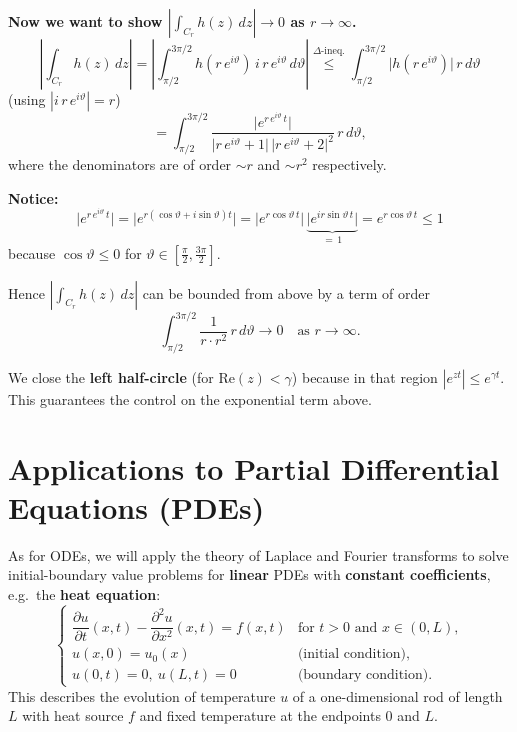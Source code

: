 \begin{example}
\medskip

\textbf{Now we want to show $\left|\int_{C_r} h(z)\,dz\right| \to 0$ as $r \to \infty$.}
\[
\left|\int_{C_r} h(z)\,dz\right|
= \left|\int_{\pi/2}^{3\pi/2} h(r\,e^{i\vartheta})\,i\,r\,e^{i\vartheta}\,d\vartheta\right|
\overset{\Delta\text{-ineq.}}{\leq}
\int_{\pi/2}^{3\pi/2} \bigl|h(r\,e^{i\vartheta})\bigr|\,r\,d\vartheta
\]
(using $|i\,r\,e^{i\vartheta}| = r$)
\[
= \int_{\pi/2}^{3\pi/2} \frac{\bigl|e^{r\,e^{i\vartheta}\,t}\bigr|}{\bigl|r\,e^{i\vartheta} + 1\bigr|\,\bigl|r\,e^{i\vartheta} + 2\bigr|^2}\,r\,d\vartheta,
\]
where the denominators are of order $\sim r$ and $\sim r^2$ respectively.

\textbf{Notice:}
\[
\bigl|e^{r\,e^{i\vartheta}\,t}\bigr|
= \bigl|e^{r(\cos\vartheta + i\sin\vartheta)t}\bigr|
= \bigl|e^{r\cos\vartheta\,t}\bigr|\,\underbrace{\bigl|e^{ir\sin\vartheta\,t}\bigr|}_{=\,1}
= e^{r\cos\vartheta\,t} \leq 1
\]
because $\cos\vartheta \leq 0$ for $\vartheta \in [\tfrac{\pi}{2}, \tfrac{3\pi}{2}]$.

Hence $\left|\int_{C_r} h(z)\,dz\right|$ can be bounded from above by a term of order
\[
\int_{\pi/2}^{3\pi/2} \frac{1}{r\cdot r^2}\,r\,d\vartheta \to 0 \quad \text{as } r \to \infty.
\]

\begin{remark}
We close the \textbf{left half-circle} (for $\mathrm{Re}(z) < \gamma$) because in that region $|e^{zt}| \leq e^{\gamma t}$. This guarantees the control on the exponential term above.
\end{remark}
\end{example}

\section{Applications to Partial Differential Equations (PDEs)}

As for ODEs, we will apply the theory of Laplace and Fourier transforms to solve initial-boundary value problems for \textbf{linear} PDEs with \textbf{constant coefficients}, e.g.\ the \textbf{heat equation}:
\[
\begin{cases}
\dfrac{\partial u}{\partial t}(x, t) - \dfrac{\partial^2 u}{\partial x^2}(x, t) = f(x, t)
& \text{for } t > 0 \text{ and } x \in (0, L), \\[2pt]
u(x, 0) = u_0(x) & \text{(initial condition),} \\[2pt]
u(0, t) = 0,\ u(L, t) = 0 & \text{(boundary condition).}
\end{cases}
\]
This describes the evolution of temperature $u$ of a one-dimensional rod of length $L$ with heat source $f$ and fixed temperature at the endpoints $0$ and $L$.

